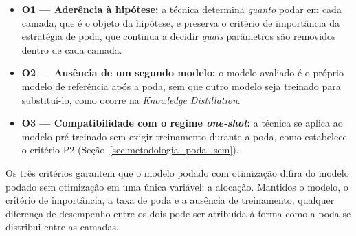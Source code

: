 \begin{itemize}
    \item \textbf{O1 --- Aderência à hipótese:} a técnica determina \textit{quanto} podar
          em cada camada, que é o objeto da hipótese, e preserva o critério de importância
          da estratégia de poda, que continua a decidir \textit{quais} parâmetros são
          removidos dentro de cada camada.
    \item \textbf{O2 --- Ausência de um segundo modelo:} o modelo avaliado é o próprio
          modelo de referência após a poda, sem que outro modelo seja treinado para
          substituí-lo, como ocorre na \textit{Knowledge Distillation}.
    \item \textbf{O3 --- Compatibilidade com o regime \textit{one-shot}:} a técnica se
          aplica ao modelo pré-treinado sem exigir treinamento durante a poda, como
          estabelece o critério P2 (Seção~\ref{sec:metodologia_poda_sem}).
\end{itemize}

Os três critérios garantem que o modelo podado com otimização difira do modelo podado sem
otimização em uma única variável: a alocação. Mantidos o modelo, o critério de
importância, a taxa de poda e a ausência de treinamento, qualquer diferença de desempenho
entre os dois pode ser atribuída à forma como a poda se distribui entre as camadas.



